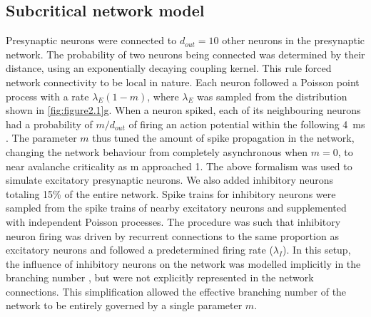 \subsection{Subcritical network model}
Presynaptic neurons were connected to $d_{out}=10$ other neurons in the presynaptic network. The probability of two neurons being connected was determined by their distance, using an exponentially decaying coupling kernel. This rule forced network connectivity to be local in nature. Each neuron followed a Poisson point process with a rate $\lambda_E (1-m)$, where $\lambda_E$ was sampled from the distribution shown in \autoref{fig:figure2.1}g. When a neuron spiked, each of its neighbouring neurons had a probability of $m/d_{out}$ of firing an action potential within the following \qty{4}{\milli\second} \cite{Wilting2019}. The parameter $m$ thus tuned the amount of spike propagation in the network, changing the network behaviour from completely asynchronous when $m=0$, to near avalanche criticality as m approached 1. The above formalism was used to simulate excitatory presynaptic neurons. We also added inhibitory neurons totaling 15\% of the entire network. Spike trains for inhibitory neurons were sampled from the spike trains of nearby excitatory neurons and supplemented with independent Poisson processes. The procedure was such that inhibitory neuron firing was driven by recurrent connections to the same proportion as excitatory neurons and followed a predetermined firing rate ($\lambda_I$). In this setup, the influence of inhibitory neurons on the network was modelled implicitly in the branching number \cite{Li2020}, but were not explicitly represented in the network connections. This simplification allowed the effective branching number of the network to be entirely governed by a single parameter $m$. 

